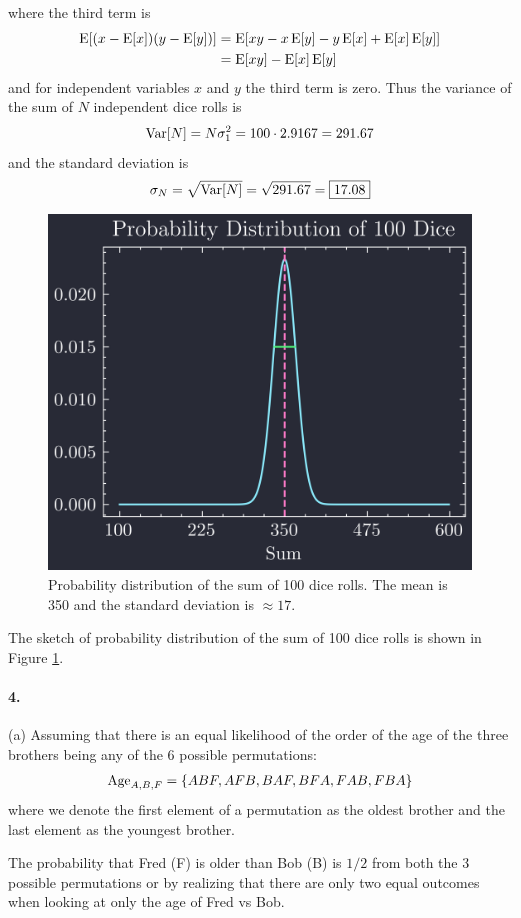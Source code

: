 \documentclass[../main.tex]{subfiles}
\begin{document}
where the third term is
\begin{align*}
    \operatorname{E}[(x - \operatorname{E}[x])(y - \operatorname{E}[y])] &= \operatorname{E}[xy - x\operatorname{E}[y] - y\operatorname{E}[x] + \operatorname{E}[x]\operatorname{E}[y]] \\
    &= \operatorname{E}[xy] - \operatorname{E}[x]\operatorname{E}[y]
\end{align*}
and for independent variables $x$ and $y$ the third term is zero. Thus the variance of the sum of
$N$ independent dice rolls is
\begin{align*}
    \operatorname{Var}[N] = N\sigma_1^2 = 100 \cdot 2.9167 = 291.67
\end{align*}
and the standard deviation is
\begin{align*}
    \sigma_N = \sqrt{\operatorname{Var}[N]} = \sqrt{291.67} = \boxed{17.08}
\end{align*}

\begin{figure}[ht]
    \centering
    \includegraphics[width=0.5\linewidth]{hw1_3b.png}
    \captionsetup{width=0.8\linewidth}
    \caption{Probability distribution of the sum of 100 dice rolls. The mean is 350 and the
    standard deviation is $\approx 17$.}
    \label{fig:hw1_3b}
\end{figure}
The sketch of probability distribution of the sum of 100 dice rolls is shown in
Figure \ref{fig:hw1_3b}. 

\paragraph{4.} (a) Assuming that there is an equal likelihood of the order of the age of the three
brothers being any of the 6 possible permutations:
\begin{align*}
    \textrm{Age}_{A,B,F} = \qt{ABF, AFB, BAF, BFA, FAB, FBA}
\end{align*}
where we denote the first element of a permutation as the oldest brother and the last element as
the youngest brother.

The probability that Fred (F) is older than Bob 
(B) is $\boxed{1/2}$ from both the 3 possible permutations or by realizing that there are only two
equal outcomes when looking at only the age of Fred vs Bob.
\end{document}

